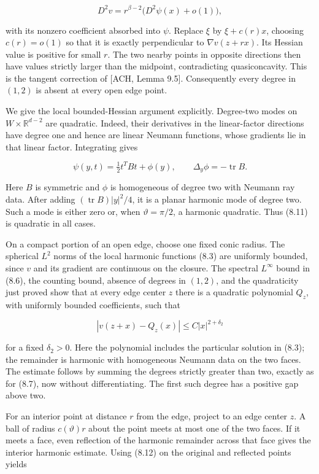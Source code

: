 \documentclass[11pt]{article}
\begin{document}
\[
D^2v=r^{\beta-2}\bigl(D^2\psi(x)+o(1)\bigr),
\tag{8.10}
\]

with its nonzero coefficient absorbed into \(\psi\). Replace \(\xi\) by
\(\xi+c(r)x\), choosing \(c(r)=o(1)\) so that it is exactly
perpendicular to \(\nabla v(z+rx)\). Its Hessian value is positive for
small \(r\). The two nearby points in opposite directions then have
values strictly larger than the midpoint, contradicting quasiconcavity.
This is the tangent correction of {[}ACH, Lemma 9.5{]}. Consequently
every degree in \((1,2)\) is absent at every open edge point.

We give the local bounded-Hessian argument explicitly. Degree-two modes
on \(W\times\mathbb R^{d-2}\) are quadratic. Indeed, their derivatives
in the linear-factor directions have degree one and hence are linear
Neumann functions, whose gradients lie in that linear factor.
Integrating gives

\[
\psi(y,t)=\tfrac12 t^T B t+\phi(y),\qquad
\Delta_y\phi=-\operatorname{tr}B.
\tag{8.11}
\]

Here \(B\) is symmetric and \(\phi\) is homogeneous of degree two with
Neumann ray data. After adding \((\operatorname{tr}B)|y|^2/4\), it is a
planar harmonic mode of degree two. Such a mode is either zero or, when
\(\vartheta=\pi/2\), a harmonic quadratic. Thus (8.11) is quadratic in
all cases.

On a compact portion of an open edge, choose one fixed conic radius. The
spherical \(L^2\) norms of the local harmonic functions (8.3) are
uniformly bounded, since \(v\) and its gradient are continuous on the
closure. The spectral \(L^\infty\) bound in (8.6), the counting bound,
absence of degrees in \((1,2)\), and the quadraticity just proved show
that at every edge center \(z\) there is a quadratic polynomial \(Q_z\),
with uniformly bounded coefficients, such that

\[
|v(z+x)-Q_z(x)|\le C|x|^{2+\delta_2}
\tag{8.12}
\]

for a fixed \(\delta_2>0\). Here the polynomial includes the particular
solution in (8.3); the remainder is harmonic with homogeneous Neumann
data on the two faces. The estimate follows by summing the degrees
strictly greater than two, exactly as for (8.7), now without
differentiating. The first such degree has a positive gap above two.

For an interior point at distance \(r\) from the edge, project to an
edge center \(z\). A ball of radius \(c(\vartheta)r\) about the point
meets at most one of the two faces. If it meets a face, even reflection
of the harmonic remainder across that face gives the interior harmonic
estimate. Using (8.12) on the original and reflected points yields
\end{document}
